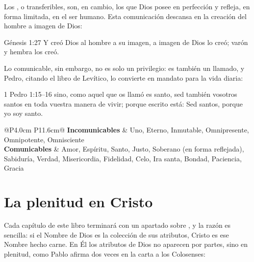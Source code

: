 Los , o transferibles, son, en cambio, los que Dios posee en perfección y refleja, en forma limitada, en el ser humano. Esta comunicación descansa en la creación del hombre a imagen de Dios:

\begin{verso}{Génesis 1:27}
Y creó Dios al hombre a su imagen, a imagen de Dios lo creó; varón y hembra los creó.
\end{verso}

Lo comunicable, sin embargo, no es solo un privilegio: es también un llamado, y Pedro, citando el libro de Levítico, lo convierte en mandato para la vida diaria:

\begin{verso}{1 Pedro 1:15–16}
sino, como aquel que os llamó es santo, sed también vosotros santos en toda vuestra manera de vivir; porque escrito está: Sed santos, porque yo soy santo.
\end{verso}

\begin{table}[htbp]
\centering\small
\caption{Segunda clasificación de los atributos de Dios}\label{tab:cruce}
\renewcommand{\arraystretch}{1.3}
\begin{tabular}{@{}P{4.0cm} P{11.6cm}@{}}
\toprule
\textbf{Incomunicables} & Uno, Eterno, Inmutable, Omnipresente, Omnipotente, Omnisciente \\
\textbf{Comunicables} & Amor, Espíritu, Santo, Justo, Soberano (en forma reflejada), Sabiduría, Verdad, Misericordia, Fidelidad, Celo, Ira santa, Bondad, Paciencia, Gracia \\ \bottomrule
\end{tabular}
\par{}
\end{table}

\section{La plenitud en Cristo}

Cada capítulo de este libro terminará con un apartado sobre , y la razón es sencilla: si el Nombre de Dios es la colección de sus atributos, Cristo es ese Nombre hecho carne. En Él los atributos de Dios no aparecen por partes, sino en plenitud, como Pablo afirma dos veces en la carta a los Colosenses:

